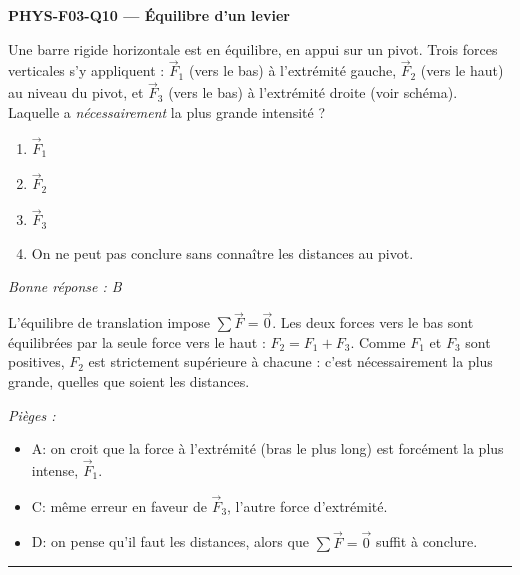 \documentclass[11pt,a4paper]{article}
\newcommand{\vv}[1]{\vec{#1}}\newcommand{\ds}{\displaystyle}
\begin{document}
\noindent\textbf{PHYS-F03-Q10 --- Équilibre d'un levier}\par
Une barre rigide horizontale est en équilibre, en appui sur un pivot. Trois forces verticales s'y
appliquent : $\vv F_1$ (vers le bas) à l'extrémité gauche, $\vv F_2$ (vers le haut) au niveau du pivot,
et $\vv F_3$ (vers le bas) à l'extrémité droite (voir schéma). Laquelle a \emph{nécessairement} la plus
grande intensité ?
\begin{center}
\end{center}
\begin{enumerate}[label=\Alph*)]
\item $\vv F_1$
\item $\vv F_2$
\item $\vv F_3$
\item On ne peut pas conclure sans connaître les distances au pivot.
\end{enumerate}
\textit{Bonne réponse : B}\par
L'équilibre de translation impose $\sum\vv F = \vv 0$. Les deux forces vers le bas sont équilibrées par
la seule force vers le haut : $F_2 = F_1 + F_3$. Comme $F_1$ et $F_3$ sont positives, $F_2$ est
strictement supérieure à chacune : c'est nécessairement la plus grande, quelles que soient les
distances.\par
\textit{Pièges :}
\begin{itemize}
\item A: on croit que la force à l'extrémité (bras le plus long) est forcément la plus intense, $\vv F_1$.
\item C: même erreur en faveur de $\vv F_3$, l'autre force d'extrémité.
\item D: on pense qu'il faut les distances, alors que $\sum\vv F = \vv 0$ suffit à conclure.
\end{itemize}
\vspace{8pt}\hrule\vspace{8pt}
\end{document}
